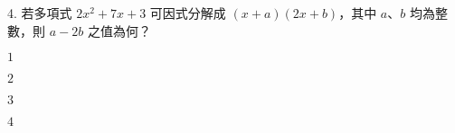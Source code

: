 \documentclass[12pt]{article}
\begin{document}
\begin{problem}
  \item[4.] 若多項式 $2x^2 + 7x + 3$ 可因式分解成 $(x + a)(2x + b)$，其中 $a$、$b$ 均為整數，則 $a - 2b$ 之值為何？
  \begin{choices}
    \item $1$
    \item $2$
    \item $3$
    \item $4$
  \end{choices}
\end{problem}
\end{document}
